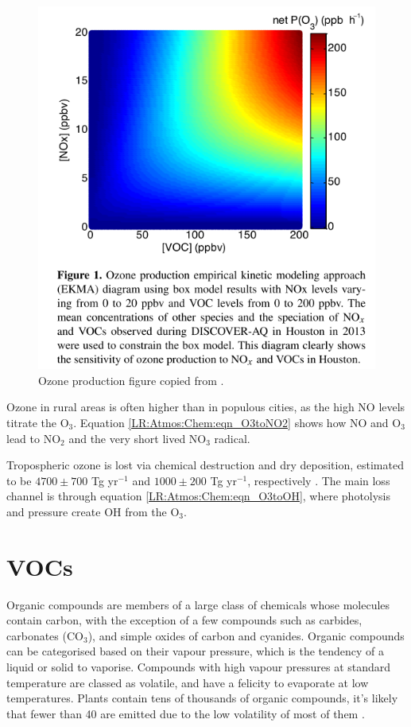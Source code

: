     \begin{figure}
      \includegraphics[width=.75\textwidth]{Figures/Mazzuca2016_NOxVOCOzone.png}
      \caption{Ozone production figure copied from \cite{Mazzuca2016}.}
      \label{LR:VOCs:fig_NOXVOCOzone}
    \end{figure}
    
    
    Ozone in rural areas is often higher than in populous cities, as the high NO levels titrate the O$_3$.
    Equation \ref{LR:Atmos:Chem:eqn_O3toNO2} shows how NO and O$_3$ lead to NO$_2$ and the very short lived NO$_3$ radical.
    
    Tropospheric ozone is lost via chemical destruction and dry deposition, estimated to be $4700\pm700$ Tg yr$^{-1}$ and $1000\pm200$ Tg yr$^{-1}$, respectively \citep{Stevenson2006}.
    The main loss channel is through equation \ref{LR:Atmos:Chem:eqn_O3toOH}, where photolysis and pressure create OH from the O$_3$.
    

\section{VOCs}
\label{LR:VOCs}
  Organic compounds are members of a large class of chemicals whose molecules contain carbon, with the exception of a few compounds such as carbides, carbonates (CO$_3$), and simple oxides of carbon and cyanides.
  Organic compounds can be categorised based on their vapour pressure, which is the tendency of a liquid or solid to vaporise.
  Compounds with high vapour pressures at standard temperature are classed as volatile, and have a felicity to evaporate at low temperatures.
  Plants contain tens of thousands of organic compounds, it's likely that fewer than 40 are emitted due to the low volatility of most of them \citep{Guenther2000}.
  
